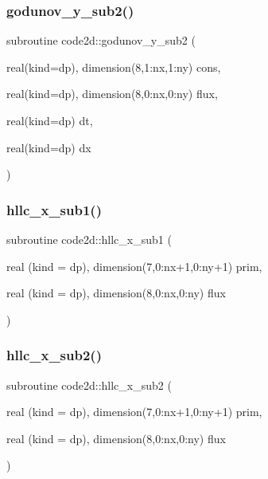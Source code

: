 \mbox{\label{main2Dv1_8f90_af2bc178b3e046a285b7e624ecb7246b8}} 
\subsubsection{\texorpdfstring{godunov\+\_\+y\+\_\+sub2()}{godunov\_y\_sub2()}}
{\footnotesize\ttfamily subroutine code2d\+::godunov\+\_\+y\+\_\+sub2 (\begin{DoxyParamCaption}\item[{real(kind=dp), dimension(8,1\+:nx,1\+:ny)}]{cons,  }\item[{real(kind=dp), dimension(8,0\+:nx,0\+:ny)}]{flux,  }\item[{real(kind=dp)}]{dt,  }\item[{real(kind=dp)}]{dx }\end{DoxyParamCaption})}

\mbox{\label{main2Dv1_8f90_ad651365c868e762b033239f23065b179}} 
\subsubsection{\texorpdfstring{hllc\+\_\+x\+\_\+sub1()}{hllc\_x\_sub1()}}
{\footnotesize\ttfamily subroutine code2d\+::hllc\+\_\+x\+\_\+sub1 (\begin{DoxyParamCaption}\item[{real (kind = dp), dimension(7,0\+:nx+1,0\+:ny+1)}]{prim,  }\item[{real (kind = dp), dimension(8,0\+:nx,0\+:ny)}]{flux }\end{DoxyParamCaption})}

\mbox{\label{main2Dv1_8f90_a542b368221e3c5b6eed538ddc6538ca5}} 
\subsubsection{\texorpdfstring{hllc\+\_\+x\+\_\+sub2()}{hllc\_x\_sub2()}}
{\footnotesize\ttfamily subroutine code2d\+::hllc\+\_\+x\+\_\+sub2 (\begin{DoxyParamCaption}\item[{real (kind = dp), dimension(7,0\+:nx+1,0\+:ny+1)}]{prim,  }\item[{real (kind = dp), dimension(8,0\+:nx,0\+:ny)}]{flux }\end{DoxyParamCaption})}


